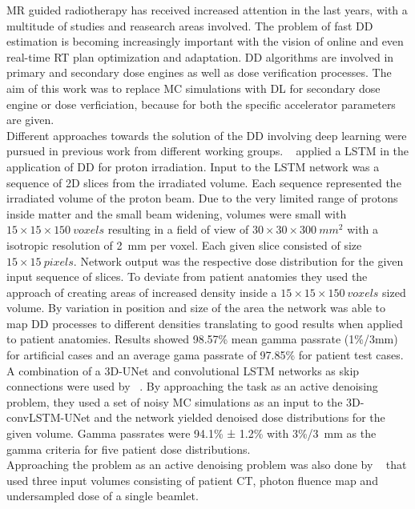 
MR guided radiotherapy has received increased attention in the last years, with a multitude of studies and reasearch areas involved.
The problem of fast \acs{DD} estimation is becoming increasingly important with the vision of online and even real-time \acs{RT} plan optimization and adaptation.
\acs{DD} algorithms are involved in primary and secondary dose engines as well as dose verification processes. 
The aim of this work was to replace \acs{MC} simulations with \acs{DL} for secondary dose engine or dose verficiation, because for both the specific accelerator parameters are given.\\
Different approaches towards the solution of the \acs{DD} involving deep learning were pursued in previous work from different working groups. 
\citeauthor{neishabouri_long_2021}~\cite{neishabouri_long_2021} applied a \ac{LSTM} in the application of \acs{DD} for proton irradiation.
Input to the \acs{LSTM} network was a sequence of 2D slices from the irradiated volume.
Each sequence represented the irradiated volume of the proton beam.
Due to the very limited range of protons inside matter and the small beam widening, volumes were small with $15 \times 15 \times 150~voxels$ resulting in a field of view of $30 \times 30 \times 300~mm^2$ with a isotropic resolution of 2~mm per voxel.
Each given slice consisted of size $15 \times 15~pixels$.
Network output was the respective dose distribution for the given input sequence of slices.
To deviate from patient anatomies they used the approach of creating areas of increased density inside a $15 \times 15 \times 150~voxels$ sized volume.
By variation in position and size of the area the network was able to map \acs{DD} processes to different densities translating to good results when applied to patient anatomies.
Results showed 98.57\% mean gamma passrate (1\%/3mm) for artificial cases and an average gama passrate of 97.85\% for patient test cases.\\
A combination of a 3D-UNet and convolutional \acs{LSTM} networks as skip connections were used by \citeauthor{de_bruijne_high-particle_2021}~\cite{de_bruijne_high-particle_2021}.
By approaching the task as an active denoising problem, they used a set of noisy \acs{MC} simulations as an input to the 3D-convLSTM-UNet and the network yielded denoised dose distributions for the given volume.
Gamma passrates were 94.1\% ± 1.2\% with 3\%/3~mm as the gamma criteria for five patient dose distributions.\\
Approaching the problem as an active denoising problem was also done by \citeauthor{neph_deepmcdose_2019}~\cite{neph_deepmcdose_2019} that used three input volumes consisting of patient CT, photon fluence map and undersampled dose of a single beamlet.
